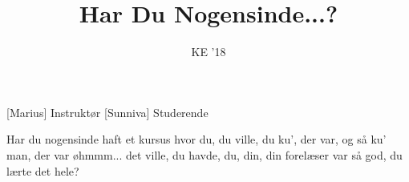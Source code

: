 \documentclass[a4paper,11pt]{article}
\title{Har Du Nogensinde...?}
\author{KE '18}
\begin{document}
\maketitle

\begin{roles}
[Marius] Instruktør
[Sunniva] Studerende
\end{roles}

\begin{sketch}
 Har du nogensinde haft et kursus hvor du, du ville, du ku’, der var, og så ku’ man, der var øhmmm... det ville, du havde, du, din, din forelæser var så god, du lærte det hele?
\end{sketch}
\end{document}

